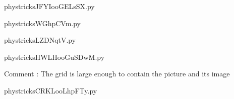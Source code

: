     

    \clearpage
    


    \newcommand{\CaptionFigJFYIooGELsSX}{<+Type your caption here+>}
    \begin{center}
        
    \end{center}
    phystricksJFYIooGELsSX.py

    

    \clearpage
    


    \newcommand{\CaptionFigWGhpCVm}{<+Type your caption here+>}
    \begin{center}
        
    \end{center}
    phystricksWGhpCVm.py

    

    \clearpage
    


    \newcommand{\CaptionFigLZDNqtV}{<+Type your caption here+>}
    \begin{center}
        
    \end{center}
    phystricksLZDNqtV.py

    

    \clearpage
    


    \newcommand{\CaptionFigHWLHooGuSDwM}{<+Type your caption here+>}
    \begin{center}
        
    \end{center}
    phystricksHWLHooGuSDwM.py

    Comment : The grid is large enough to contain the picture and its image

    \clearpage
    


    \newcommand{\CaptionFigCRKLooLhpFTy}{<+Type your caption here+>}
    \begin{center}
        
    \end{center}
    phystricksCRKLooLhpFTy.py

    

    \clearpage
    

